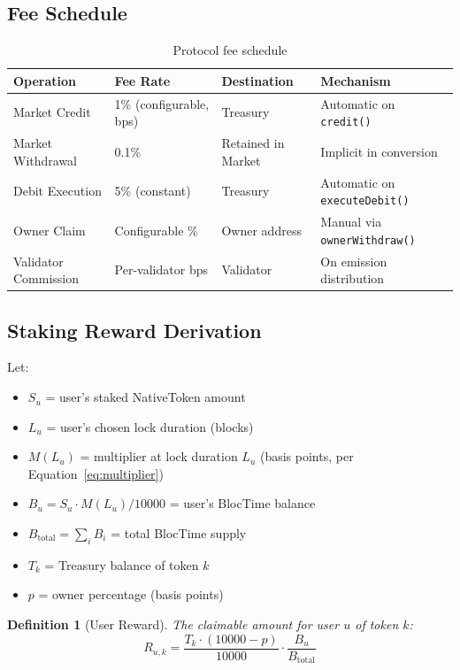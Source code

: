 \documentclass[11pt,a4paper]{article}
\newtheorem{definition}{Definition}[section]
\begin{document}
\subsection{Fee Schedule}

\begin{table}[H]
\centering
\begin{tabular}{llll}
\toprule
\textbf{Operation} & \textbf{Fee Rate} & \textbf{Destination} & \textbf{Mechanism} \\
\midrule
Market Credit & 1\% (configurable, bps) & Treasury & Automatic on \texttt{credit()} \\
Market Withdrawal & 0.1\% & Retained in Market & Implicit in conversion \\
Debit Execution & 5\% (constant) & Treasury & Automatic on \texttt{executeDebit()} \\
Owner Claim & Configurable \% & Owner address & Manual via \texttt{ownerWithdraw()} \\
Validator Commission & Per-validator bps & Validator & On emission distribution \\
\bottomrule
\end{tabular}
\caption{Protocol fee schedule}
\end{table}

\subsection{Staking Reward Derivation}

Let:
\begin{itemize}
    \item $S_u$ = user's staked NativeToken amount
    \item $L_u$ = user's chosen lock duration (blocks)
    \item $M(L_u)$ = multiplier at lock duration $L_u$ (basis points, per Equation~\ref{eq:multiplier})
    \item $B_u = S_u \cdot M(L_u) / 10000$ = user's BlocTime balance
    \item $B_{\text{total}} = \sum_{i} B_i$ = total BlocTime supply
    \item $T_k$ = Treasury balance of token $k$
    \item $p$ = owner percentage (basis points)
\end{itemize}

\begin{definition}[User Reward]
The claimable amount for user $u$ of token $k$:
\begin{equation}
R_{u,k} = \frac{T_k \cdot (10000 - p)}{10000} \cdot \frac{B_u}{B_{\text{total}}}
\label{eq:reward}
\end{equation}
\end{definition}
\end{document}
